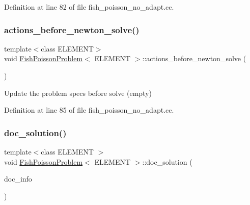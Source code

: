 Definition at line 82 of file fish\+\_\+poisson\+\_\+no\+\_\+adapt.\+cc.

\mbox{\label{classFishPoissonProblem_a4f3ddd6ae8117d36cace040a2cad68a3}} 
\subsubsection{\texorpdfstring{actions\+\_\+before\+\_\+newton\+\_\+solve()}{actions\_before\_newton\_solve()}}
{\footnotesize\ttfamily template$<$class E\+L\+E\+M\+E\+NT$>$ \\
void \hyperlink{classFishPoissonProblem}{Fish\+Poisson\+Problem}$<$ E\+L\+E\+M\+E\+NT $>$\+::actions\+\_\+before\+\_\+newton\+\_\+solve (\begin{DoxyParamCaption}{ }\end{DoxyParamCaption})\hspace{0.3cm}{\ttfamily [inline]}}



Update the problem specs before solve (empty) 



Definition at line 85 of file fish\+\_\+poisson\+\_\+no\+\_\+adapt.\+cc.

\mbox{\label{classFishPoissonProblem_a728ae67316d80029132b98b6a4e5ffe5}} 
\subsubsection{\texorpdfstring{doc\+\_\+solution()}{doc\_solution()}}
{\footnotesize\ttfamily template$<$class E\+L\+E\+M\+E\+NT $>$ \\
void \hyperlink{classFishPoissonProblem}{Fish\+Poisson\+Problem}$<$ E\+L\+E\+M\+E\+NT $>$\+::doc\+\_\+solution (\begin{DoxyParamCaption}\item[{Doc\+Info \&}]{doc\+\_\+info }\end{DoxyParamCaption})}



